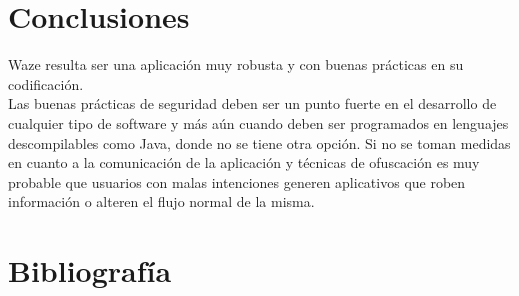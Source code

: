 \documentclass[12pt]{article}
\begin{document}
\section{Conclusiones}
Waze resulta ser una aplicación muy robusta y con buenas prácticas en su codificación. 
\\

Las buenas prácticas de seguridad deben ser un punto fuerte en el desarrollo de cualquier tipo de software y más aún cuando deben ser programados en lenguajes descompilables como Java, donde no se tiene otra opción. Si no se toman medidas en cuanto a la comunicación de la aplicación y técnicas de ofuscación es muy probable que usuarios con malas intenciones generen aplicativos que roben información o alteren el flujo normal de la misma.

\newpage
\section{Bibliografía}

\end{document}
